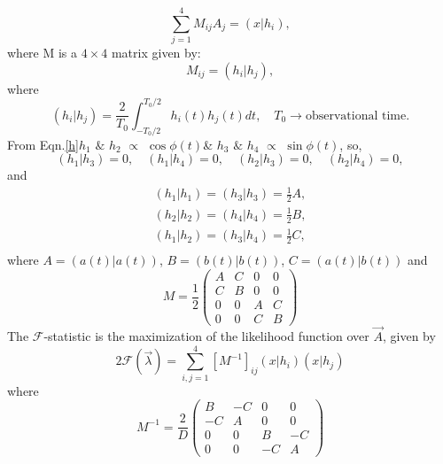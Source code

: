 \documentclass{ttuthes2007}
\begin{document}
\begin{equation}
\sum_{j=1}^4M_{ij}A_j =(x|h_i),
\end{equation}
where M is a $4 \times 4$ matrix given by:
\begin{equation}
M_{ij} = (h_i|h_j),
\end{equation}
where
\begin{equation}
(h_i|h_j)=\frac{2}{T_0}\int_{-T_0/2}^{T_0/2}h_i(t)h_j(t)dt, \quad
T_0 \rightarrow \text{observational time.}
\end{equation}
From Eqn.\ref{h}\quad $h_1$ $\&$ $h_2$ $\propto$ $\cos{\phi(t)}$\quad \& \quad $h_3$ $\&$ $h_4$
$\propto$ $\sin{\phi(t)}$, so,
\begin{equation}
(h_1|h_3)=0, \quad (h_1|h_4)=0, \quad (h_2|h_3)=0, \quad (h_2|h_4)=0,  
\end{equation}
and
\begin{equation}
\begin{split}
(h_1|h_1)=(h_3|h_3)=\frac{1}{2}A,\\
(h_2|h_2)=(h_4|h_4)=\frac{1}{2}B,\\
(h_1|h_2)=(h_3|h_4)=\frac{1}{2}C,\\
\end{split}
\end{equation}
where  $A=(a(t)|a(t))$, \quad  $B=(b(t)|b(t))$, \quad  $C=(a(t)|b(t))$ and 
\begin{equation*}
M=\frac{1}{2}
\begin{pmatrix}
A & C & 0 & 0\\
C & B & 0 & 0\\
0 & 0 & A & C\\
0 & 0 & C & B
\end{pmatrix}
\end{equation*}
The $\mathcal{F}$-statistic is the maximization of the likelihood function over
$\vec{A}$, given by 
\begin{equation}
2\mathcal{F}(\vec{\lambda})=\sum_{i,j=1}^{4}[M^{-1}]_{ij}(x|h_i)(x|h_j)
\end{equation}
where
\begin{equation*}                                                               
M^{-1}=\frac{2}{D}                                                                   
\begin{pmatrix}                                                                 
B & -C & 0 & 0\\                                                                 
-C & A & 0 & 0\\                                                                 
0 & 0 & B & -C\\                                                                 
0 & 0 & -C & A                                                                   
\end{pmatrix}                                                                   
\end{equation*} 
\end{document}
